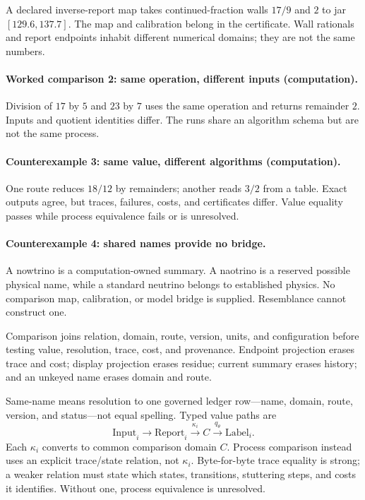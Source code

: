 A declared inverse-report map takes continued-fraction walls \(17/9\) and \(2\) to jar \([129.6,137.7]\).  The map and
calibration belong in the certificate.  Wall rationals and report endpoints inhabit different numerical domains; they
are not the same numbers.

\paragraph{Worked comparison 2: same operation, different inputs (computation).}
Division of \(17\) by \(5\) and \(23\) by \(7\) uses the same operation and returns remainder \(2\).  Inputs and quotient
identities differ.  The runs share an algorithm schema but are not the same process.

\paragraph{Counterexample 3: same value, different algorithms (computation).}
One route reduces \(18/12\) by remainders; another reads \(3/2\) from a table.  Exact outputs agree, but traces,
failures, costs, and certificates differ.  Value equality passes while process equivalence fails or is unresolved.

\paragraph{Counterexample 4: shared names provide no bridge.}
A nowtrino is a computation-owned summary.  A naotrino is a reserved possible physical name, while a standard neutrino
belongs to established physics.  No comparison map, calibration, or model bridge is supplied.  Resemblance cannot
construct one.

Comparison joins relation, domain, route, version, units, and configuration before testing value, resolution, trace,
cost, and provenance.  Endpoint projection erases trace and cost; display projection erases residue; current summary
erases history; and an unkeyed name erases domain and route.

Same-name means resolution to one governed ledger row---name, domain, route, version, and status---not equal spelling.
Typed value paths are
\[
\mathrm{Input}_i\to\mathrm{Report}_i\xrightarrow{\kappa_i}C\xrightarrow{q_\theta}\mathrm{Label}_i.
\]
Each \(\kappa_i\) converts to common comparison domain \(C\).  Process comparison instead uses an explicit trace/state
relation, not \(\kappa_i\).  Byte-for-byte trace equality is strong; a weaker relation must state which states,
transitions, stuttering steps, and costs it identifies.  Without one, process equivalence is unresolved.


